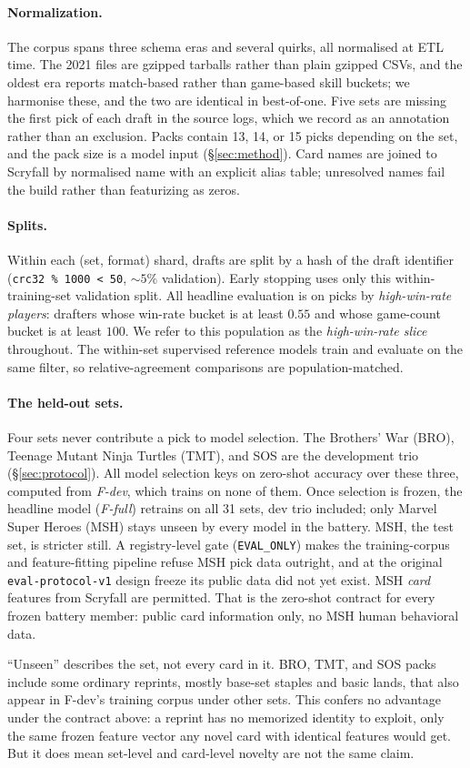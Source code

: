 \paragraph{Normalization.}
The corpus spans three schema eras and several quirks, all normalised at
ETL time. The 2021 files are gzipped tarballs rather than plain gzipped
CSVs, and the oldest era reports match-based rather than game-based skill
buckets; we harmonise these, and the two are identical in best-of-one.
Five sets are missing the first pick of each draft in the source logs,
which we record as an annotation rather than an exclusion. Packs contain
13, 14, or 15 picks depending on the set, and the pack size is a model
input (\S\ref{sec:method}). Card names are joined to Scryfall by
normalised name with an explicit alias table; unresolved names fail the
build rather than featurizing as zeros.

\paragraph{Splits.}
Within each (set, format) shard, drafts are split by a hash of the draft
identifier (\texttt{crc32 \% 1000 < 50}, ${\sim}5\%$ validation). Early
stopping uses only this within-training-set validation split. All headline
evaluation is on picks by \emph{high-win-rate players}: drafters whose
win-rate bucket is at least $0.55$ and whose game-count bucket is at least
$100$. We refer to this population as the \emph{high-win-rate slice}
throughout. The within-set supervised reference models train and evaluate
on the same filter, so relative-agreement comparisons are population-matched.

\paragraph{The held-out sets.}
Four sets never contribute a pick to model selection. The Brothers' War
(BRO), Teenage Mutant Ninja Turtles (TMT), and SOS are the development
trio (\S\ref{sec:protocol}). All model selection keys on zero-shot
accuracy over these three, computed from \emph{F-dev}, which trains on
none of them. Once selection is frozen, the headline model (\emph{F-full})
retrains on all 31 sets, dev trio included; only Marvel Super Heroes
(MSH) stays unseen by every model in the battery. MSH, the test set, is
stricter still. A registry-level gate (\texttt{EVAL\_ONLY}) makes the
training-corpus and feature-fitting pipeline refuse MSH pick data
outright, and at the original \texttt{eval-protocol-v1} design freeze its
public data did not yet exist. MSH \emph{card} features from Scryfall are
permitted. That is the zero-shot contract for every frozen battery member:
public card information only, no MSH human behavioral data.

``Unseen'' describes the set, not every card in it. BRO, TMT, and SOS
packs include some ordinary reprints, mostly base-set staples and basic
lands, that also appear in F-dev's training corpus under other sets. This
confers no advantage under the contract above: a reprint has no memorized
identity to exploit, only the same frozen feature vector any novel card
with identical features would get. But it does mean set-level and
card-level novelty are not the same claim.
